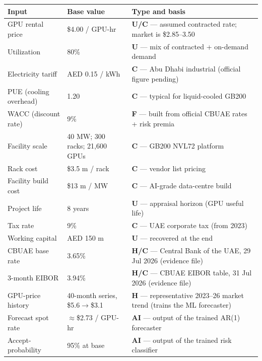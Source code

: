 \documentclass[11pt,a4paper]{article}
\begin{document}
\begin{center}
\small
\begin{longtable}{L{4.4cm} L{4.2cm} L{6cm}}
\toprule
\textbf{Input} & \textbf{Base value} & \textbf{Type and basis}\\
\midrule
\endhead
GPU rental price & \$4.00 / GPU-hr & \textbf{U/C} --- assumed contracted rate; market is \$2.85--3.50\\
Utilization & 80\% & \textbf{U} --- mix of contracted + on-demand demand\\
Electricity tariff & AED 0.15 / kWh & \textbf{C} --- Abu Dhabi industrial (official figure pending)\\
PUE (cooling overhead) & 1.20 & \textbf{C} --- typical for liquid-cooled GB200\\
WACC (discount rate) & 9\% & \textbf{F} --- built from official CBUAE rates + risk premia\\
Facility scale & 40 MW; 300 racks; 21{,}600 GPUs & \textbf{C} --- GB200 NVL72 platform\\
Rack cost & \$3.5 m / rack & \textbf{C} --- vendor list pricing\\
Facility build cost & \$13 m / MW & \textbf{C} --- AI-grade data-centre build\\
Project life & 8 years & \textbf{U} --- appraisal horizon (GPU useful life)\\
Tax rate & 9\% & \textbf{C} --- UAE corporate tax (from 2023)\\
Working capital & AED 150 m & \textbf{U} --- recovered at the end\\
CBUAE base rate & 3.65\% & \textbf{H/C} --- Central Bank of the UAE, 29 Jul 2026 (evidence file)\\
3-month EIBOR & 3.94\% & \textbf{H/C} --- CBUAE EIBOR table, 31 Jul 2026 (evidence file)\\
GPU-price history & 40-month series, \$5.6$\to$\$3.1 & \textbf{H} --- representative 2023--26 market trend (trains the ML forecaster)\\
Forecast spot rate & $\approx$\$2.73 / GPU-hr & \textbf{AI} --- output of the trained AR(1) forecaster\\
Accept-probability & 95\% at base & \textbf{AI} --- output of the trained risk classifier\\
\bottomrule
\end{longtable}
\end{center}
\end{document}
